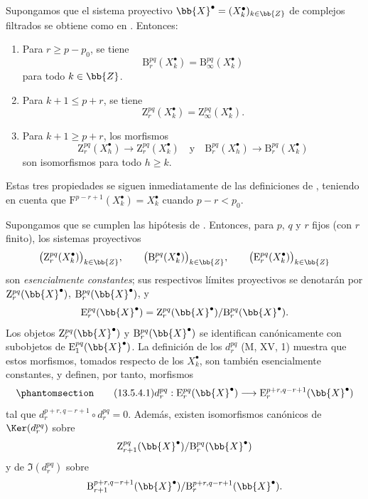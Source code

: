 \documentclass[oneside]{amsart}
\renewcommand{\leq}{\leqslant}
\renewcommand{\geq}{\geqslant}
\newcommand{\oldpage}[2][]{{\marginnote{\normalfont\textbf{#1}~|~#2}}\ignorespaces}
\let\EGAOriginalLabel\label
\renewcommand{\label}[1]{\phantomsection\EGAOriginalLabel{#1}}
\begin{document}
\begin{lemma}[13.5.3]
\label{0.13.5.3}
Supongamos que el sistema proyectivo
$\bb{X}^\bullet=(X^\bullet_k)_{k\in\bb{Z}}$ de complejos filtrados se
obtiene como en . Entonces:
\begin{enumerate}
  \item[{\rm a)}] Para $r\geq p-p_0$, se tiene
  \[
    \mathrm{B}_r^{pq}(X^\bullet_k)
    =
    \mathrm{B}_\infty^{pq}(X^\bullet_k)
  \]
  para todo $k\in\bb{Z}$.
  \item[{\rm b)}] Para $k+1\leq p+r$, se tiene
  \[
    \mathrm{Z}_r^{pq}(X^\bullet_k)
    =
    \mathrm{Z}_\infty^{pq}(X^\bullet_k).
  \]
  \item[{\rm c)}] Para $k+1\geq p+r$, los morfismos
  \[
    \mathrm{Z}_r^{pq}(X^\bullet_h)
    \longrightarrow
    \mathrm{Z}_r^{pq}(X^\bullet_k)
    \quad\text{y}\quad
    \mathrm{B}_r^{pq}(X^\bullet_h)
    \longrightarrow
    \mathrm{B}_r^{pq}(X^\bullet_k)
  \]
  son isomorfismos para todo $h\geq k$.
\end{enumerate}
\end{lemma}

\oldpage[0\textsubscript{III}]{72}
Estas tres propiedades se siguen inmediatamente de las definiciones de
, teniendo en cuenta que
$\mathrm{F}^{p-r+1}(X^\bullet_k)=X^\bullet_k$ cuando $p-r<p_0$.

\begin{env}[13.5.4]
\label{0.13.5.4}
Supongamos que se cumplen las hipótesis de .
Entonces, para $p$, $q$ y $r$ fijos (con $r$ finito), los sistemas
proyectivos
\[
  \bigl(\mathrm{Z}_r^{pq}(X^\bullet_k)\bigr)_{k\in\bb{Z}},
  \qquad
  \bigl(\mathrm{B}_r^{pq}(X^\bullet_k)\bigr)_{k\in\bb{Z}},
  \qquad
  \bigl(\mathrm{E}_r^{pq}(X^\bullet_k)\bigr)_{k\in\bb{Z}}
\]
son \emph{esencialmente constantes}; sus respectivos límites proyectivos
se denotarán por
$\mathrm{Z}_r^{pq}(\bb{X}^\bullet)$,
$\mathrm{B}_r^{pq}(\bb{X}^\bullet)$, y
\[
  \mathrm{E}_r^{pq}(\bb{X}^\bullet)
  =
  \mathrm{Z}_r^{pq}(\bb{X}^\bullet)/
  \mathrm{B}_r^{pq}(\bb{X}^\bullet).
\]
Los objetos $\mathrm{Z}_r^{pq}(\bb{X}^\bullet)$ y
$\mathrm{B}_r^{pq}(\bb{X}^\bullet)$ se identifican canónicamente con
subobjetos de $\mathrm{E}_1^{pq}(\bb{X}^\bullet)$.
La definición de los $d_r^{pq}$ (M, XV, 1) muestra que estos
morfismos, tomados respecto de los $X^\bullet_k$, son también esencialmente
constantes, y definen, por tanto, morfismos
\begin{equation}
\label{0.13.5.4.1}
\tag{13.5.4.1}
  d_r^{pq}:
  \mathrm{E}_r^{pq}(\bb{X}^\bullet)
  \longrightarrow
  \mathrm{E}_r^{p+r,q-r+1}(\bb{X}^\bullet)
\end{equation}
tal que
$d_r^{p+r,q-r+1}\circ d_r^{pq}=0$.
Además, existen isomorfismos canónicos de
$\Ker(d_r^{pq})$ sobre
\[
  \mathrm{Z}_{r+1}^{pq}(\bb{X}^\bullet)/
  \mathrm{B}_r^{pq}(\bb{X}^\bullet)
\]
y de $\Im(d_r^{pq})$ sobre
\[
  \mathrm{B}_{r+1}^{p+r,q-r+1}(\bb{X}^\bullet)/
  \mathrm{B}_r^{p+r,q-r+1}(\bb{X}^\bullet).
\]
\end{env}
\end{document}
